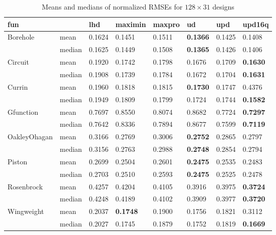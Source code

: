 \documentclass [PhD] {package/uclathes}
\begin{document}
\begin{table}[h!tb]

\caption{\label{tab:mean_median_128x31}Means and medians of normalized RMSEs for $128\times 31$ designs}
\centering
\begin{tabular}[t]{llllllll}
\toprule
fun &  & lhd & maximin & maxpro & ud & upd & upd16q\\
\midrule
Borehole & mean & 0.1624 & 0.1451 & 0.1511 & \textbf{0.1366} & 0.1425 & 0.1408\\
\cmidrule{2-8}
 & median & 0.1625 & 0.1449 & 0.1508 & \textbf{0.1365} & 0.1426 & 0.1406\\
\cmidrule{1-8}
Circuit & mean & 0.1920 & 0.1742 & 0.1798 & 0.1676 & 0.1709 & \textbf{0.1630}\\
\cmidrule{2-8}
 & median & 0.1908 & 0.1739 & 0.1784 & 0.1672 & 0.1704 & \textbf{0.1631}\\
\cmidrule{1-8}
Currin & mean & 0.1960 & 0.1818 & 0.1815 & \textbf{0.1730} & 0.1747 & 0.4376\\
\cmidrule{2-8}
 & median & 0.1949 & 0.1809 & 0.1799 & 0.1724 & 0.1744 & \textbf{0.1582}\\
\cmidrule{1-8}
Gfunction & mean & 0.7697 & 0.8550 & 0.8074 & 0.8682 & 0.7724 & \textbf{0.7297}\\
\cmidrule{2-8}
 & median & 0.7642 & 0.8336 & 0.7894 & 0.8677 & 0.7599 & \textbf{0.7119}\\
\cmidrule{1-8}
OakleyOhagan & mean & 0.3166 & 0.2769 & 0.3006 & \textbf{0.2752} & 0.2865 & 0.2797\\
\cmidrule{2-8}
 & median & 0.3156 & 0.2763 & 0.2988 & \textbf{0.2748} & 0.2854 & 0.2794\\
\cmidrule{1-8}
Piston & mean & 0.2699 & 0.2504 & 0.2601 & \textbf{0.2475} & 0.2535 & 0.2483\\
\cmidrule{2-8}
 & median & 0.2703 & 0.2510 & 0.2593 & \textbf{0.2475} & 0.2525 & 0.2478\\
\cmidrule{1-8}
Rosenbrock & mean & 0.4257 & 0.4204 & 0.4105 & 0.3916 & 0.3975 & \textbf{0.3724}\\
\cmidrule{2-8}
 & median & 0.4248 & 0.4189 & 0.4102 & 0.3909 & 0.3977 & \textbf{0.3720}\\
\cmidrule{1-8}
Wingweight & mean & 0.2037 & \textbf{0.1748} & 0.1900 & 0.1756 & 0.1821 & 0.3112\\
\cmidrule{2-8}
 & median & 0.2027 & 0.1745 & 0.1879 & 0.1752 & 0.1819 & \textbf{0.1669}\\
\bottomrule
\end{tabular}
\end{table}
\end{document}
